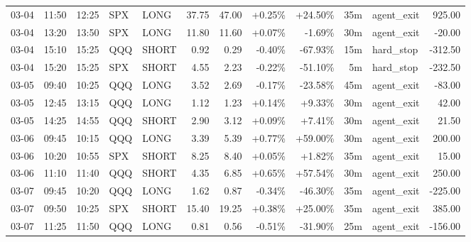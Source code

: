 \documentclass[11pt,a4paper,twoside]{article}
\begin{document}
\begin{center}
\begin{longtable}{>{\color{txtmain}}l l l l l r r r r r >{\color{txtmain}}l r}
03-04 & 11:50 & 12:25 & SPX & LONG & 37.75 & 47.00 & \textcolor{wingreen}{+0.25\%} & \textcolor{wingreen}{+24.50\%} & 35m & agent\_exit & \textcolor{wingreen}{925.00} \\
03-04 & 13:20 & 13:50 & SPX & LONG & 11.80 & 11.60 & \textcolor{wingreen}{+0.07\%} & \textcolor{lossred}{-1.69\%} & 30m & agent\_exit & \textcolor{lossred}{-20.00} \\
03-04 & 15:10 & 15:25 & QQQ & SHORT & 0.92 & 0.29 & \textcolor{lossred}{-0.40\%} & \textcolor{lossred}{-67.93\%} & 15m & hard\_stop & \textcolor{lossred}{-312.50} \\
03-04 & 15:20 & 15:25 & SPX & SHORT & 4.55 & 2.23 & \textcolor{lossred}{-0.22\%} & \textcolor{lossred}{-51.10\%} & 5m & hard\_stop & \textcolor{lossred}{-232.50} \\
03-05 & 09:40 & 10:25 & QQQ & LONG & 3.52 & 2.69 & \textcolor{lossred}{-0.17\%} & \textcolor{lossred}{-23.58\%} & 45m & agent\_exit & \textcolor{lossred}{-83.00} \\
03-05 & 12:45 & 13:15 & QQQ & LONG & 1.12 & 1.23 & \textcolor{wingreen}{+0.14\%} & \textcolor{wingreen}{+9.33\%} & 30m & agent\_exit & \textcolor{wingreen}{42.00} \\
03-05 & 14:25 & 14:55 & QQQ & SHORT & 2.90 & 3.12 & \textcolor{wingreen}{+0.09\%} & \textcolor{wingreen}{+7.41\%} & 30m & agent\_exit & \textcolor{wingreen}{21.50} \\
03-06 & 09:45 & 10:15 & QQQ & LONG & 3.39 & 5.39 & \textcolor{wingreen}{+0.77\%} & \textcolor{wingreen}{+59.00\%} & 30m & agent\_exit & \textcolor{wingreen}{200.00} \\
03-06 & 10:20 & 10:55 & SPX & SHORT & 8.25 & 8.40 & \textcolor{wingreen}{+0.05\%} & \textcolor{wingreen}{+1.82\%} & 35m & agent\_exit & \textcolor{wingreen}{15.00} \\
03-06 & 11:10 & 11:40 & QQQ & SHORT & 4.35 & 6.85 & \textcolor{wingreen}{+0.65\%} & \textcolor{wingreen}{+57.54\%} & 30m & agent\_exit & \textcolor{wingreen}{250.00} \\
03-07 & 09:45 & 10:20 & QQQ & LONG & 1.62 & 0.87 & \textcolor{lossred}{-0.34\%} & \textcolor{lossred}{-46.30\%} & 35m & agent\_exit & \textcolor{lossred}{-225.00} \\
03-07 & 09:50 & 10:25 & SPX & SHORT & 15.40 & 19.25 & \textcolor{wingreen}{+0.38\%} & \textcolor{wingreen}{+25.00\%} & 35m & agent\_exit & \textcolor{wingreen}{385.00} \\
03-07 & 11:25 & 11:50 & QQQ & LONG & 0.81 & 0.56 & \textcolor{lossred}{-0.51\%} & \textcolor{lossred}{-31.90\%} & 25m & agent\_exit & \textcolor{lossred}{-156.00} \\

\end{longtable}
\end{center}
\end{document}
